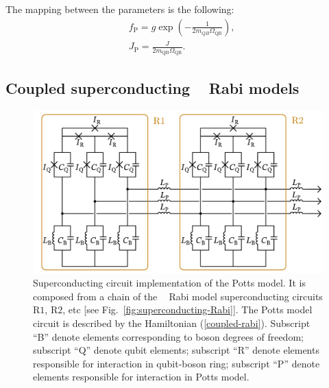 \documentclass[reprint, aps, prx, amsmath, amssymb, longbibliography, superscriptaddress]{revtex4-2}
\DeclareMathOperator{\Zthree}{\mathbb{Z}_3}
\begin{document}
The mapping between the parameters is the following:
\begin{equation}
\begin{aligned}
    &f_{\text{P}} = g \exp\left(-\frac{1}{2 m_{QB} \Omega_{\text{QB}}}\right),\\
    &J_{\text{P}} = \frac{J }{2 m_{\text{QB}} \Omega_{\text{QB}}} .
\end{aligned}
\end{equation}

\subsection{Coupled superconducting \texorpdfstring{$\Zthree$}{Z3} Rabi models}


\begin{figure}[t]
    \includegraphics[width=\linewidth]{pics/SC_Potts_circuit_with_contours.pdf}
    \caption{Superconducting circuit implementation of the Potts model. It is composed from a chain of the $\Zthree$ Rabi model superconducting circuits $\mathrm{R1}$, $\mathrm{R2}$, etc [see Fig.~\ref{fig:superconducting-Rabi}]. The Potts model circuit is described by the Hamiltonian (\ref{coupled-rabi}). Subscript ``B'' denote elements corresponding to boson degrees of freedom; subscript ``Q'' denote qubit elements; subscript ``R'' denote elements responsible for interaction in qubit-boson ring; subscript ``P'' denote elements responsible for interaction in Potts model.}
    \label{fig:superconducting-potts}
\end{figure}
\end{document}
